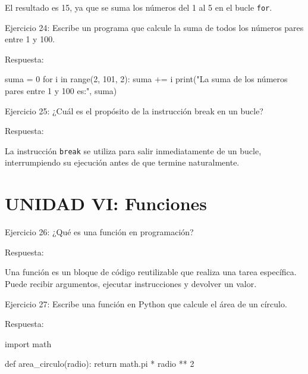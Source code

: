 \documentclass[
  a4paper,
  DIV=11,
  numbers=noendperiod,
  onepage,
  openany]{scrreprt}
\newenvironment{Shaded}{\begin{snugshade}}{\end{snugshade}}
\newcommand{\BuiltInTok}[1]{\textcolor[rgb]{0.00,0.23,0.31}{#1}}
\newcommand{\ControlFlowTok}[1]{\textcolor[rgb]{0.00,0.23,0.31}{#1}}
\newcommand{\DecValTok}[1]{\textcolor[rgb]{0.68,0.00,0.00}{#1}}
\newcommand{\ImportTok}[1]{\textcolor[rgb]{0.00,0.46,0.62}{#1}}
\newcommand{\KeywordTok}[1]{\textcolor[rgb]{0.00,0.23,0.31}{#1}}
\newcommand{\NormalTok}[1]{\textcolor[rgb]{0.00,0.23,0.31}{#1}}
\newcommand{\OperatorTok}[1]{\textcolor[rgb]{0.37,0.37,0.37}{#1}}
\newcommand{\StringTok}[1]{\textcolor[rgb]{0.13,0.47,0.30}{#1}}
\begin{document}
El resultado es 15, ya que se suma los números del 1 al 5 en el bucle
\texttt{for}.

Ejercicio 24: Escribe un programa que calcule la suma de todos los
números pares entre 1 y 100.

Respuesta:

\begin{Shaded}
\begin{Highlighting}[]
\NormalTok{suma }\OperatorTok{=} \DecValTok{0}
\ControlFlowTok{for}\NormalTok{ i }\KeywordTok{in} \BuiltInTok{range}\NormalTok{(}\DecValTok{2}\NormalTok{, }\DecValTok{101}\NormalTok{, }\DecValTok{2}\NormalTok{):}
\NormalTok{    suma }\OperatorTok{+=}\NormalTok{ i}
\BuiltInTok{print}\NormalTok{(}\StringTok{"La suma de los números pares entre 1 y 100 es:"}\NormalTok{, suma)}
\end{Highlighting}
\end{Shaded}

Ejercicio 25: ¿Cuál es el propósito de la instrucción break en un bucle?

Respuesta:

La instrucción \texttt{break} se utiliza para salir inmediatamente de un
bucle, interrumpiendo su ejecución antes de que termine naturalmente.

\hypertarget{unidad-vi-funciones}{%
\section{UNIDAD VI: Funciones}\label{unidad-vi-funciones}}

Ejercicio 26: ¿Qué es una función en programación?

Respuesta:

Una función es un bloque de código reutilizable que realiza una tarea
específica. Puede recibir argumentos, ejecutar instrucciones y devolver
un valor.

Ejercicio 27: Escribe una función en Python que calcule el área de un
círculo.

Respuesta:

\begin{Shaded}
\begin{Highlighting}[]
\ImportTok{import}\NormalTok{ math}

\KeywordTok{def}\NormalTok{ area\_circulo(radio):}
\ControlFlowTok{return}\NormalTok{ math.pi }\OperatorTok{*}\NormalTok{ radio }\OperatorTok{**} \DecValTok{2}
\end{Highlighting}
\end{Shaded}
\end{document}
